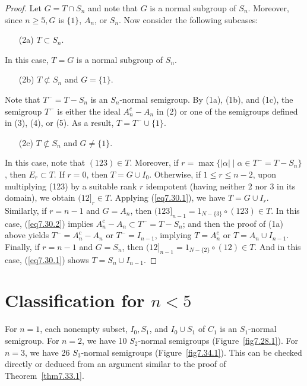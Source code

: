 \documentclass{surv-l}
\numberwithin{equation}{section}
\numberwithin{table}{section}
\numberwithin{figure}{section}
\theoremstyle{plain}
\theoremstyle{definition}
\begin{document}
\begin{proof}
\noindent Let $G=T\cap S_{n}$ and note that $G$ is a normal subgroup of
$S_{n}$. Moreover, since $n \geq 5, G$ is $\{1\}$, $A_{n}$, or
$S_{n}$. Now consider the following subcases:
\begin{enumerate}
\item[(2a)] $T\subset S_{n}$.
\end{enumerate}
In this case, $T=G$ is a normal subgroup of $S_{n}$.
\begin{enumerate}
\item[(2b)] $T\not\subset S_{n}$ and $G=\{1\}$.
\end{enumerate}
Note that $T^{-}=T-S_{n}$ is an $S_{n}$-normal semigroup. By (1a),
(1b), and (1c), the semigroup $T^{-}$ is either the ideal
$A_{n}^{c}-A_{n}$ in (2) or one of the semigroups defined in (3),
(4), or (5). As a result, $T=T^{-}\cup\{1\}$.
\begin{enumerate}
\item[(2c)] $T\not\subset S_{n}$ and $G\neq\{1\}$.
\end{enumerate}
In this case, note that $(123) \in T$. Moreover, if
$r=\max\{|\alpha|\mid \alpha\in T^{-}= T-S_{n}\}$, then
$E_{r}\subset T$. If $r=0$, then $T=G\cup I_{0}$. Otherwise, if
$1\leq r\leq n-2$, upon multiplying (123) by a suitable rank $r$
idempotent (having neither 2 nor 3 in its domain), we obtain
$(12]_{r}\in T$. Applying (\ref{eq7.30.1}), we have $T=G\cup
I_{r}$. Similarly, if $r=n-1$ and $G=A_{n}$, then
$(123]_{n-1}=1_{N-\{3\}}\circ (123)\in T$. In this case,
(\ref{eq7.30.2}) implies $A_{n}^{c}-A_{n}\subset T^{-}=T-S_{n}$;
and then the proof of (1a) above yields $T^{-}=A_{n}^{c}-A_{n}$ or
$T^{-}=I_{n-1}$, implying $T=A_{n}^{c}$ or $T= A_{n}\cup I_{n-1}$.
Finally, if $r=n-1$ and $G=S_{n}$, then $(12]_{n-1}=1_{N-\{2\}}\circ
(12) \in T$. And in this case, (\ref{eq7.30.1}) shows $T=S_{n}\cup
I_{n-1}.$
\end{proof}

\section{Classification for $n <5$}\label{sec7.34}

For $n=1$, each nonempty subset, $I_{0}, S_{1}$, and $I_{0}\cup
S_{1}$ of $C_{1}$ is an $S_{1}$-normal semigroup. For $n =2$, we
have 10 $S_{2}$-normal semigroups (Figure~\ref{fig7.28.1}). For $n
=3$, we have 26 $S_{3}$-normal semigroups
(Figure~\ref{fig7.34.1}). This can be checked directly or deduced
from an argument similar to the proof of Theorem~\ref{thm7.33.1}.
\end{document}
